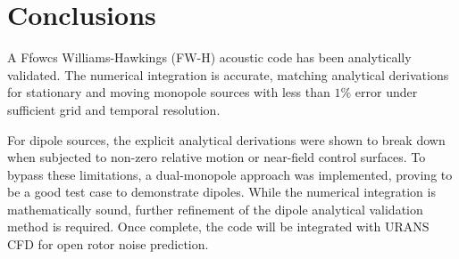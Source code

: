 
\chapter{Conclusions} \label{sec:conclusions}

A Ffowcs Williams-Hawkings (FW-H) acoustic code has been analytically validated. The numerical integration is accurate, matching analytical derivations for stationary and moving monopole sources with less than $1\%$ error under sufficient grid and temporal resolution.

For dipole sources, the explicit analytical derivations were shown to break down when subjected to non-zero relative motion or near-field control surfaces. To bypass these limitations, a dual-monopole approach was implemented, proving to be a good test case to demonstrate dipoles. While the numerical integration is mathematically sound, further refinement of the dipole analytical validation method is required. Once complete, the code will be integrated with URANS CFD for open rotor noise prediction.